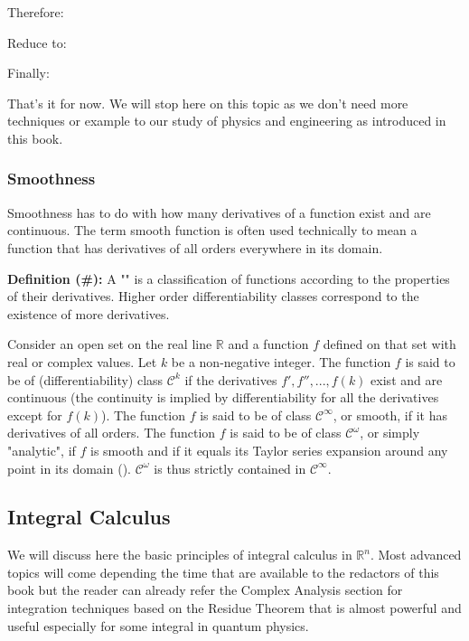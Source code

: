 	Therefore:
	
	Reduce to:
	
	Finally:
	
	That's it for now. We will stop here on this topic as we don't need more techniques or example to our study of physics and engineering as introduced in this book.
	
		\pagebreak
		\subsubsection{Smoothness}
		 Smoothness has to do with how many derivatives of a function exist and are continuous. The term smooth function is often used technically to mean a function that has derivatives of all orders everywhere in its domain.
		 
		 \textbf{Definition  (\#\mydef):} A "" is a classification of functions according to the properties of their derivatives. Higher order differentiability classes correspond to the existence of more derivatives.
		 
		 Consider an open set on the real line $\mathbb{R}$ and a function $f$ defined on that set with real or complex values. Let $k$ be a non-negative integer. The function $f$ is said to be of (differentiability) class $\mathcal{C}^k$ if the derivatives $f', f'', ..., f(k)$ exist and are continuous (the continuity is implied by differentiability for all the derivatives except for $f(k)$). The function $f$ is said to be of class $\mathcal{C}^\infty$, or smooth, if it has derivatives of all orders. The function $f$ is said to be of class $\mathcal{C}^\omega$, or simply "analytic", if $f$ is smooth and if it equals its Taylor series expansion around any point in its domain (). $\mathcal{C}^\omega$ is thus strictly contained in $\mathcal{C}^\infty$.

		\pagebreak
		 \subsection{Integral Calculus}
		 We will discuss here the basic principles of integral calculus in $\mathbb{R}^n$. Most advanced topics will come depending the time that are available to the redactors of this book but the reader can already refer the Complex Analysis section for integration techniques based on the Residue Theorem that is almost powerful and useful especially for some integral in quantum physics.
		 
